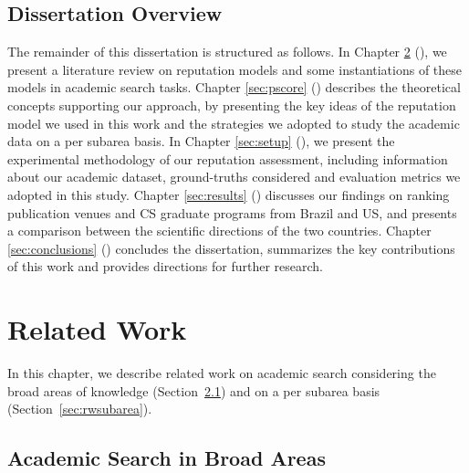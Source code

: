 \documentclass[msc]{ppgccufmg}
\begin{document}
\section{Dissertation Overview}
The remainder of this dissertation is structured as follows. In Chapter \ref{sec:related} (), we present a literature review on reputation models and some instantiations of these models in academic search tasks. Chapter \ref{sec:pscore} () describes the theoretical concepts supporting our approach, by presenting the key ideas of the reputation model we used in this work and the strategies we adopted to study the academic data on a per subarea basis. In Chapter \ref{sec:setup} (), we present the experimental methodology of our reputation assessment, including information about our academic dataset, ground-truths considered and evaluation metrics we adopted in this study. Chapter \ref{sec:results} () discusses our findings on ranking publication venues and CS graduate programs from Brazil and US, and presents a comparison between the scientific directions of the two countries. Chapter \ref{sec:conclusions} () concludes the dissertation, summarizes the key contributions of this work and provides directions for further research.


\chapter{Related Work}\label{sec:related}

In this chapter, we describe related work on academic search considering the broad areas of knowledge (Section~\ref{sec:rwbroad}) and on a per subarea basis (Section~\ref{sec:rwsubarea}).


\section{Academic Search in Broad Areas}\label{sec:rwbroad}
\end{document}
